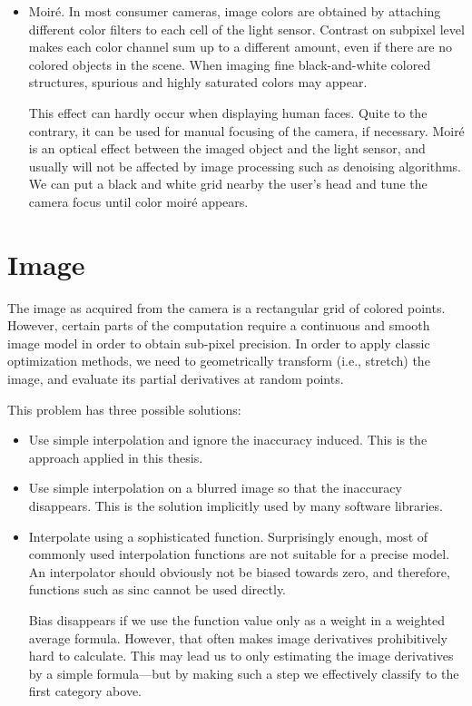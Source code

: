 \begin{itemize}
\item
Moiré.
In most consumer cameras, image colors are obtained by attaching different color filters to each cell of the light sensor.
Contrast on subpixel level makes each color channel sum up to a different amount, even if there are no colored objects in the scene.
When imaging fine black-and-white colored structures, spurious and highly saturated colors may appear.

This effect can hardly occur when displaying human faces.
Quite to the contrary, it can be used for manual focusing of the camera, if necessary.
Moiré is an optical effect between the imaged object and the light sensor, and usually will not be affected by image processing such as denoising algorithms.
We can put a black and white grid nearby the user's head and tune the camera focus until color moiré appears.

\end{itemize}

\section{Image}
\label{s.imagemodel}
The image as acquired from the camera is a rectangular grid of colored points.
However, certain parts of the computation require a continuous and smooth image model in order to obtain sub-pixel precision.
In order to apply classic optimization methods, we need to geometrically transform (i.e., stretch) the image, and evaluate its partial derivatives at random points.

This problem has three possible solutions:

\begin{itemize}

\item Use simple interpolation and ignore the inaccuracy induced.
This is the approach applied in this thesis.

\item Use simple interpolation on a blurred image so that the inaccuracy disappears.
This is the solution implicitly used by many software libraries.

\item Interpolate using a sophisticated function.
Surprisingly enough, most of commonly used interpolation functions are not suitable for a precise model.
An interpolator should obviously not be biased towards zero, and therefore, functions such as $\mathrm{sinc}$ cannot be used directly.

Bias disappears if we use the function value only as a weight in a weighted average formula.
However, that often makes image derivatives prohibitively hard to calculate.
This may lead us to only estimating the image derivatives by a simple formula---but by making such a step we effectively classify to the first category above.

\end{itemize}


